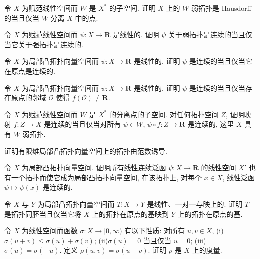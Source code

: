 \documentclass[../../main.tex]{subfiles}
\begin{document}
\begin{exercise}\label{exercise:ch14-42}
令 $X$ 为赋范线性空间而 $W$ 是 $X^{*}$ 的子空间. 证明 $X$ 上的 $W$ 弱拓扑是 Hausdorff 的当且仅当 $W$ 分离 $X$ 中的点.
\end{exercise}

\begin{exercise}\label{exercise:ch14-43}
令 $X$ 为赋范线性空间而 $\psi:X\to\mathbf{R}$ 是线性的. 证明 $\psi$ 关于弱拓扑是连续的当且仅当它关于强拓扑是连续的.
\end{exercise}

\begin{exercise}\label{exercise:ch14-44}
令 $X$ 为局部凸拓扑向量空间而 $\psi:X\to\mathbf{R}$ 是线性的. 证明 $\psi$ 是连续的当且仅当它在原点是连续的.
\end{exercise}

\begin{exercise}\label{exercise:ch14-45}
令 $X$ 为局部凸拓扑向量空间而 $\psi:X\to\mathbf{R}$ 是线性的. 证明 $\psi$ 是连续的当且仅当存在原点的邻域 $\mathcal{O}$ 使得 $f(\mathcal{O})\neq\mathbf{R}$.
\end{exercise}

\begin{exercise}\label{exercise:ch14-46}
令 $X$ 为赋范线性空间而 $W$ 是 $X^{*}$ 的分离点的子空间. 对任何拓扑空间 $Z$, 证明映射 $f:Z\to X$ 是连续的当且仅当对所有 $\psi\in W$, $\psi\circ f:Z\to\mathbf{R}$ 是连续的, 这里 $X$ 具有 $W$ 弱拓扑.
\end{exercise}

\begin{exercise}\label{exercise:ch14-47}
证明有限维局部凸拓扑向量空间上的拓扑由范数诱导.
\end{exercise}

\begin{exercise}\label{exercise:ch14-48}
令 $X$ 为局部凸拓扑向量空间. 证明所有线性连续泛函 $\psi:X\to\mathbf{R}$ 的线性空间 $X'$ 也有一个拓扑而使它成为局部凸拓扑向量空间, 在该拓扑上, 对每个 $x\in X$, 线性泛函 $\psi\mapsto\psi(x)$ 是连续的.
\end{exercise}

\begin{exercise}\label{exercise:ch14-49}
令 $X$ 与 $Y$ 为局部凸拓扑向量空间而 $T:X\to Y$ 是线性、一对一与映上的. 证明 $T$ 是拓扑同胚当且仅当它将 $X$ 上的拓扑在原点的基映到 $Y$ 上的拓扑在原点的基.
\end{exercise}

\begin{exercise}\label{exercise:ch14-50}
令 $X$ 为线性空间而函数 $\sigma:X\to[0,\infty)$ 有以下性质: 对所有 $u,v\in X$, (i)$\sigma(u+v)\leqslant\sigma(u)+\sigma(v)$; (ii)$\sigma(u)=0$ 当且仅当 $u=0$; (iii)$\sigma(u)=\sigma(-u)$. 定义 $\rho(u,v)=\sigma(u-v)$. 证明 $\rho$ 是 $X$ 上的度量.
\end{exercise}
\end{document}
